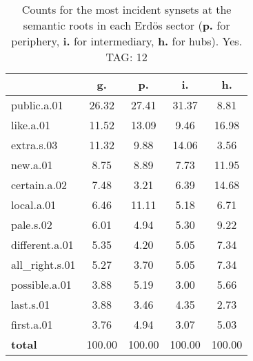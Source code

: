\begin{table}[h!]
\begin{center}
\begin{tabular}{| l | c | c | c | c |}\hline
 & g. & p. & i. & h. \\\hline
public.a.01 & 26.32  & 27.41  & 31.37  & 8.81 \\\hline
like.a.01 & 11.52  & 13.09  & 9.46  & 16.98 \\\hline
extra.s.03 & 11.32  & 9.88  & 14.06  & 3.56 \\\hline
new.a.01 & 8.75  & 8.89  & 7.73  & 11.95 \\\hline
certain.a.02 & 7.48  & 3.21  & 6.39  & 14.68 \\\hline
local.a.01 & 6.46  & 11.11  & 5.18  & 6.71 \\\hline
pale.s.02 & 6.01  & 4.94  & 5.30  & 9.22 \\\hline
different.a.01 & 5.35  & 4.20  & 5.05  & 7.34 \\\hline
all\_right.s.01 & 5.27  & 3.70  & 5.05  & 7.34 \\\hline
possible.a.01 & 3.88  & 5.19  & 3.00  & 5.66 \\\hline
last.s.01 & 3.88  & 3.46  & 4.35  & 2.73 \\\hline
first.a.01 & 3.76  & 4.94  & 3.07  & 5.03 \\\hline
{{\bf total}} & 100.00  & 100.00  & 100.00  & 100.00 \\\hline
\end{tabular}
\caption{Counts for the most incident synsets at the semantic roots in each Erd\"os sector ({\bf p.} for periphery, {\bf i.} for intermediary, {\bf h.} for hubs). Yes. TAG: 12}
\end{center}
\end{table}